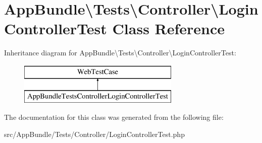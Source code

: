 \hypertarget{class_app_bundle_1_1_tests_1_1_controller_1_1_login_controller_test}{}\section{App\+Bundle\textbackslash{}Tests\textbackslash{}Controller\textbackslash{}Login\+Controller\+Test Class Reference}
\label{class_app_bundle_1_1_tests_1_1_controller_1_1_login_controller_test}
Inheritance diagram for App\+Bundle\textbackslash{}Tests\textbackslash{}Controller\textbackslash{}Login\+Controller\+Test\+:\begin{figure}[H]
\begin{center}
\leavevmode
\includegraphics[height=2.000000cm]{class_app_bundle_1_1_tests_1_1_controller_1_1_login_controller_test}
\end{center}
\end{figure}


The documentation for this class was generated from the following file\+:\begin{DoxyCompactItemize}
\item 
src/\+App\+Bundle/\+Tests/\+Controller/Login\+Controller\+Test.\+php\end{DoxyCompactItemize}
